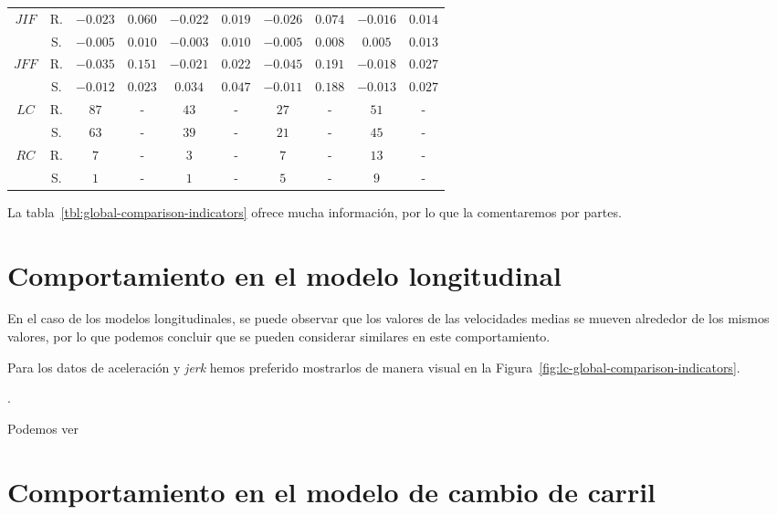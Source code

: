 \begin{table}
\begin{tabular}{cccccccccc}
		\multirow{2}{*}{\textbf{$JIF$}} & R. & $-0.023$ & $0.060$  & $-0.022$ & $0.019$  & $-0.026$ & $0.074$  & $-0.016$ & $0.014$  \\
		                                & S. & $-0.005$ & $0.010$  & $-0.003$ & $0.010$  & $-0.005$ & $0.008$  & $0.005$  & $0.013$  \\
		\multirow{2}{*}{\textbf{$JFF$}} & R. & $-0.035$ & $0.151$  & $-0.021$ & $0.022$  & $-0.045$ & $0.191$  & $-0.018$ & $0.027$  \\
		                                & S. & $-0.012$ & $0.023$  & $0.034$  & $0.047$  & $-0.011$ & $0.188$  & $-0.013$ & $0.027$  \\
		\multirow{2}{*}{\textbf{$LC$}}  & R. & $87$     &    -     & $43$     &    -     & $27$     &    -     & $51$     &    -     \\
		                                & S. & $63$     &    -     & $39$     &    -     & $21$     &    -     & $45$     &    -     \\
		\multirow{2}{*}{\textbf{$RC$}}  & R. & $7$      &    -     & $3$      &    -     & $7$      &    -     & $13$     &    -     \\
                                        & S. & $1$      &    -     & $1$      &    -     & $5$      &    -     & $9$      &    -     \\
        \hline
	\end{tabular}
\end{table}

La tabla~\ref{tbl:global-comparison-indicators} ofrece mucha información, por lo que la comentaremos por partes.

\section{Comportamiento en el modelo longitudinal}

En el caso de los modelos longitudinales, se puede observar que los valores de las velocidades medias se mueven alrededor de los mismos valores, por lo que podemos concluir que se pueden considerar similares en este comportamiento.

Para los datos de aceleración y \textit{jerk} hemos preferido mostrarlos de manera visual en la Figura~\ref{fig:lc-global-comparison-indicators}.

.

Podemos ver 

\section{Comportamiento en el modelo de cambio de carril}

